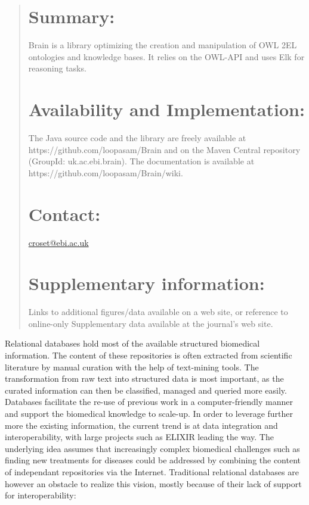 \documentclass{bioinfo}
\begin{document}
\begin{abstract}

\section{Summary:}
Brain is a library optimizing the creation and manipulation of OWL 2EL ontologies and knowledge bases.
It relies on the OWL-API and uses Elk for reasoning tasks.

\section{Availability and Implementation:}
The Java source code and the library are freely available at https://github.com/loopasam/Brain
and on the Maven Central repository (GroupId: uk.ac.ebi.brain).
The documentation is available at https://github.com/loopasam/Brain/wiki.

\section{Contact:}
\href{croset@ebi.ac.uk}{croset@ebi.ac.uk}

\section{Supplementary information:}
Links to additional figures/data available on a web site, or 
reference to online-only Supplementary data available at the journal's web site.

\end{abstract}
Relational databases hold most of the available structured biomedical information. The content of these repositories is often
extracted from scientific literature by manual curation with the help of text-mining tools. The transformation from raw text into
structured data is most important, as the curated information can then be classified, managed and queried more easily. Databases facilitate
the re-use of previous work in a computer-friendly manner and support the biomedical knowledge to scale-up. In order to leverage further 
more the existing information, the current trend is at data integration and interoperability, with large projects such as ELIXIR leading the way.
The underlying idea assumes that increasingly complex biomedical challenges such as finding new treatments for diseases could be addressed 
by combining the content of independant repositories via the Internet. 
Traditional relational databases are however an obstacle to realize this vision, mostly because of their lack of support for interoperability:
\end{document}

